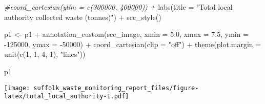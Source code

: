 \documentclass[
]{article}
\newenvironment{Shaded}{\begin{snugshade}}{\end{snugshade}}
\newcommand{\AttributeTok}[1]{\textcolor[rgb]{0.77,0.63,0.00}{#1}}
\newcommand{\CommentTok}[1]{\textcolor[rgb]{0.56,0.35,0.01}{\textit{#1}}}
\newcommand{\DecValTok}[1]{\textcolor[rgb]{0.00,0.00,0.81}{#1}}
\newcommand{\FloatTok}[1]{\textcolor[rgb]{0.00,0.00,0.81}{#1}}
\newcommand{\FunctionTok}[1]{\textcolor[rgb]{0.00,0.00,0.00}{#1}}
\newcommand{\NormalTok}[1]{#1}
\newcommand{\OtherTok}[1]{\textcolor[rgb]{0.56,0.35,0.01}{#1}}
\newcommand{\SpecialCharTok}[1]{\textcolor[rgb]{0.00,0.00,0.00}{#1}}
\newcommand{\StringTok}[1]{\textcolor[rgb]{0.31,0.60,0.02}{#1}}
\begin{document}
\begin{Shaded}
\begin{Highlighting}[]
    \CommentTok{\#coord\_cartesian(ylim = c(300000, 400000)) +}
    \FunctionTok{labs}\NormalTok{(}\AttributeTok{title =} \StringTok{"Total local authority collected waste (tonnes)"}\NormalTok{) }\SpecialCharTok{+}
    \FunctionTok{scc\_style}\NormalTok{()}

\NormalTok{p1 }\OtherTok{\textless{}{-}}\NormalTok{ p1 }\SpecialCharTok{+}
  \FunctionTok{annotation\_custom}\NormalTok{(scc\_image, }\AttributeTok{xmin =} \FloatTok{5.0}\NormalTok{, }\AttributeTok{xmax =} \FloatTok{7.5}\NormalTok{, }\AttributeTok{ymin =} \SpecialCharTok{{-}}\DecValTok{125000}\NormalTok{, }\AttributeTok{ymax =} \SpecialCharTok{{-}}\DecValTok{50000}\NormalTok{) }\SpecialCharTok{+}
  \FunctionTok{coord\_cartesian}\NormalTok{(}\AttributeTok{clip =} \StringTok{"off"}\NormalTok{) }\SpecialCharTok{+}
  \FunctionTok{theme}\NormalTok{(}\AttributeTok{plot.margin =} \FunctionTok{unit}\NormalTok{(}\FunctionTok{c}\NormalTok{(}\DecValTok{1}\NormalTok{, }\DecValTok{1}\NormalTok{, }\DecValTok{4}\NormalTok{, }\DecValTok{1}\NormalTok{), }\StringTok{"lines"}\NormalTok{))}

\NormalTok{p1}
\end{Highlighting}
\end{Shaded}

\texttt{[image: suffolk\_waste\_monitoring\_report\_files/figure-latex/total\_local\_authority-1.pdf]}
\end{document}

